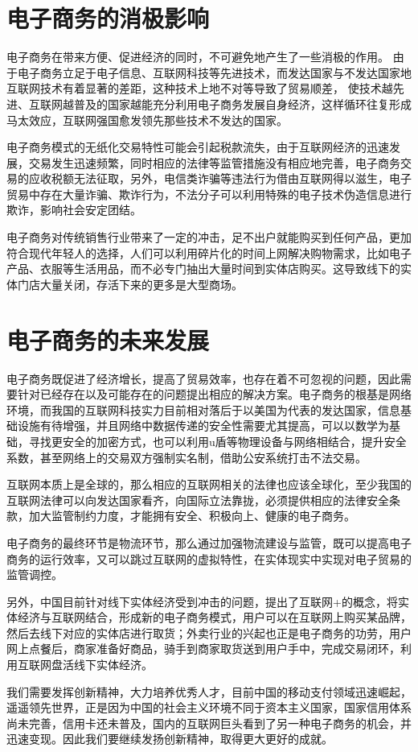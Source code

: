 \section{电子商务的消极影响}

电子商务在带来方便、促进经济的同时，不可避免地产生了一些消极的作用。
由于电子商务立足于电子信息、互联网科技等先进技术，而发达国家与不发达国家地互联网技术有着显著的差距，这种技术上地不对等导致了贸易顺差，
使技术越先进、互联网越普及的国家越能充分利用电子商务发展自身经济，这样循环往复形成马太效应，互联网强国愈发领先那些技术不发达的国家。

电子商务模式的无纸化交易特性可能会引起税款流失，由于互联网经济的迅速发展，交易发生迅速频繁，同时相应的法律等监管措施没有相应地完善，电子商务交易的应收税额无法征取，另外，电信类诈骗等违法行为借由互联网得以滋生，电子贸易中存在大量诈骗、欺诈行为，不法分子可以利用特殊的电子技术伪造信息进行欺诈，影响社会安定团结。

电子商务对传统销售行业带来了一定的冲击，足不出户就能购买到任何产品，更加符合现代年轻人的选择，人们可以利用碎片化的时间上网解决购物需求，比如电子产品、衣服等生活用品，而不必专门抽出大量时间到实体店购买。这导致线下的实体门店大量关闭，存活下来的更多是大型商场。
\section{电子商务的未来发展}
电子商务既促进了经济增长，提高了贸易效率，也存在着不可忽视的问题，因此需要针对已经存在以及可能存在的问题提出相应的解决方案。电子商务的根基是网络环境，而我国的互联网科技实力目前相对落后于以美国为代表的发达国家，信息基础设施有待增强，并且网络中数据传递的安全性需要尤其提高，可以以数学为基础，寻找更安全的加密方式，也可以利用u盾等物理设备与网络相结合，提升安全系数，甚至网络上的交易双方强制实名制，借助公安系统打击不法交易。

互联网本质上是全球的，那么相应的互联网相关的法律也应该全球化，至少我国的互联网法律可以向发达国家看齐，向国际立法靠拢，必须提供相应的法律安全条款，加大监管制约力度，才能拥有安全、积极向上、健康的电子商务。

电子商务的最终环节是物流环节，那么通过加强物流建设与监管，既可以提高电子商务的运行效率，又可以跳过互联网的虚拟特性，在实体现实中实现对电子贸易的监管调控。

另外，中国目前针对线下实体经济受到冲击的问题，提出了互联网+的概念，将实体经济与互联网结合，形成新的电子商务模式，用户可以在互联网上购买某品牌，然后去线下对应的实体店进行取货；外卖行业的兴起也正是电子商务的功劳，用户网上点餐后，商家准备好商品，骑手到商家取货送到用户手中，完成交易闭环，利用互联网盘活线下实体经济。

我们需要发挥创新精神，大力培养优秀人才，目前中国的移动支付领域迅速崛起，遥遥领先世界，正是因为中国的社会主义环境不同于资本主义国家，国家信用体系尚未完善，信用卡还未普及，国内的互联网巨头看到了另一种电子商务的机会，并迅速变现。因此我们要继续发扬创新精神，取得更大更好的成就。
